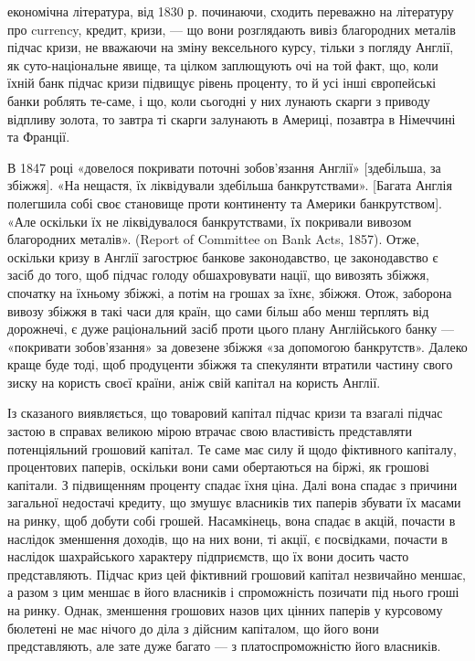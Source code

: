 економічна література, від 1830 р. починаючи, сходить переважно на літературу
про currency, кредит, кризи, — що вони розглядають вивіз благородних металів підчас
кризи, не вважаючи на зміну вексельного курсу, тільки з погляду Англії, як
суто-національне явище, та цілком заплющують очі на той факт, що, коли їхній
банк підчас кризи підвищує рівень проценту, то й усі інші європейські банки
роблять те-саме, і що, коли сьогодні у них лунають скарги з приводу відпливу
золота, то завтра ті скарги залунають в Америці, позавтра в Німеччині та Франції.

В 1847 році «довелося покривати поточні зобов’язання Англії» [здебільша, за
збіжжя]. «На нещастя, їх ліквідували здебільша банкрутствами». [Багата Англія
полегшила собі своє становище проти континенту та Америки банкрутством]. «Але
оскільки їх не ліквідувалося банкрутствами, їх покривали вивозом благородних
металів». (Report of Committee on Bank Acts, 1857). Отже, оскільки кризу в Англії
загострює банкове законодавство, це законодавство є засіб до того, щоб підчас
голоду обшахровувати нації, що вивозять збіжжя, спочатку на їхньому збіжжі,
а потім на грошах за їхнє, збіжжя. Отож, заборона вивозу збіжжя в такі часи
для країн, що сами більш або менш терплять від дорожнечі, є дуже раціональний
засіб проти цього плану Англійського банку — «покривати зобов’язання» за
довезене збіжжя «за допомогою банкрутств». Далеко краще буде тоді, щоб продуценти
збіжжя та спекулянти втратили частину свого зиску на користь своєї
країни, аніж свій капітал на користь Англії.

Із сказаного виявляється, що товаровий капітал підчас кризи та взагалі
підчас застою в справах великою мірою втрачає свою властивість представляти
потенціяльний грошовий капітал. Те саме має силу й щодо фіктивного
капіталу, процентових паперів, оскільки вони сами обертаються на біржі, як
грошові капітали. З підвищенням проценту спадає їхня ціна. Далі вона спадає
з причини загальної недостачі кредиту, що змушує власників тих паперів збувати
їх масами на ринку, щоб добути собі грошей. Насамкінець, вона спадає
в акцій, почасти в наслідок зменшення доходів, що на них вони, ті акції, є
посвідками, почасти в наслідок шахрайського характеру підприємств, що їх вони
досить часто представляють. Підчас криз цей фіктивний грошовий капітал незвичайно
меншає, а разом з цим меншає в його власників і спроможність позичати
під нього гроші на ринку. Однак, зменшення грошових назов цих цінних
паперів у курсовому бюлетені не має нічого до діла з дійсним капіталом, що
його вони представляють, але зате дуже багато — з платоспроможністю його
власників.

